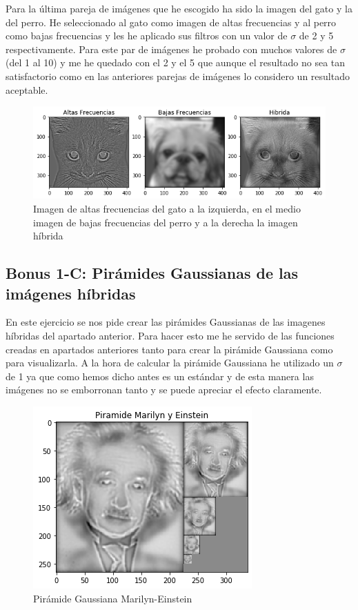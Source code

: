 \documentclass[12pt,spanish]{article}
\begin{document}
Para la última pareja de imágenes que he escogido ha sido la imagen del gato y la del perro. He seleccionado al gato como imagen de altas frecuencias y al perro como bajas frecuencias y les he aplicado sus filtros con un valor de $\sigma$ de 2 y 5 respectivamente. Para este par de imágenes he probado con muchos valores de $\sigma$ (del 1 al 10) y me he quedado con el 2 y el 5 que aunque el resultado no sea tan satisfactorio como en las anteriores parejas de imágenes lo considero un resultado aceptable.

\begin{figure}[H]
	\includegraphics[width=\textwidth]{./imagenes_memoria/b1bc}
	\caption{Imagen de altas frecuencias del gato a la izquierda, en el medio imagen de bajas frecuencias del perro y a la derecha la imagen híbrida}
	\label{bonus1bc}
\end{figure}

\subsection{Bonus 1-C: Pirámides Gaussianas de las imágenes híbridas}
En este ejercicio se nos pide crear las pirámides Gaussianas de las imagenes híbridas del apartado anterior. Para hacer esto me he servido de las funciones creadas en apartados anteriores tanto para crear la pirámide Gaussiana como para visualizarla. A la hora de calcular la pirámide Gaussiana he utilizado un $\sigma$ de 1 ya que como hemos dicho antes es un estándar y de esta manera las imágenes no se emborronan tanto y se puede apreciar el efecto claramente.

\begin{figure}[H]
	\centering
	\includegraphics[scale=1.1]{./imagenes_memoria/b1ca}
	\caption{Pirámide Gaussiana Marilyn-Einstein}
	\label{bonus1ca}
\end{figure}
\end{document}
